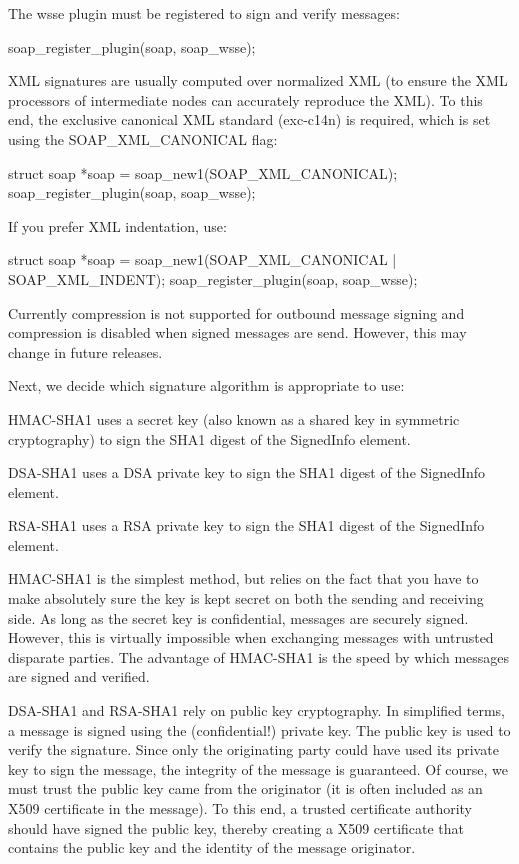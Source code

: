 The wsse plugin must be registered to sign and verify messages:


\begin{DoxyCode}
    soap_register_plugin(soap, soap_wsse);
\end{DoxyCode}


XML signatures are usually computed over normalized XML (to ensure the XML processors of intermediate nodes can accurately reproduce the XML). To this end, the exclusive canonical XML standard (exc-\/c14n) is required, which is set using the SOAP\_\-XML\_\-CANONICAL flag:


\begin{DoxyCode}
    struct soap *soap = soap_new1(SOAP_XML_CANONICAL);
    soap_register_plugin(soap, soap_wsse);
\end{DoxyCode}


If you prefer XML indentation, use:


\begin{DoxyCode}
    struct soap *soap = soap_new1(SOAP_XML_CANONICAL | SOAP_XML_INDENT);
    soap_register_plugin(soap, soap_wsse);
\end{DoxyCode}


Currently compression is not supported for outbound message signing and compression is disabled when signed messages are send. However, this may change in future releases.

Next, we decide which signature algorithm is appropriate to use:
\begin{DoxyItemize}
\item HMAC-\/SHA1 uses a secret key (also known as a shared key in symmetric cryptography) to sign the SHA1 digest of the SignedInfo element.
\item DSA-\/SHA1 uses a DSA private key to sign the SHA1 digest of the SignedInfo element.
\item RSA-\/SHA1 uses a RSA private key to sign the SHA1 digest of the SignedInfo element.
\end{DoxyItemize}

HMAC-\/SHA1 is the simplest method, but relies on the fact that you have to make absolutely sure the key is kept secret on both the sending and receiving side. As long as the secret key is confidential, messages are securely signed. However, this is virtually impossible when exchanging messages with untrusted disparate parties. The advantage of HMAC-\/SHA1 is the speed by which messages are signed and verified.

DSA-\/SHA1 and RSA-\/SHA1 rely on public key cryptography. In simplified terms, a message is signed using the (confidential!) private key. The public key is used to verify the signature. Since only the originating party could have used its private key to sign the message, the integrity of the message is guaranteed. Of course, we must trust the public key came from the originator (it is often included as an X509 certificate in the message). To this end, a trusted certificate authority should have signed the public key, thereby creating a X509 certificate that contains the public key and the identity of the message originator.

